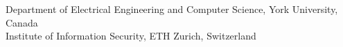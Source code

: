 {
  Department of Electrical Engineering and Computer Science, York University, Canada \\
  Institute of Information Security, ETH Zurich, Switzerland
}

\date[iFM 2013, 12/06/13]
{
  iFM 2013, Turku, Finland\\
  12th June 2013\\
}

\subject{Formal Methods}






\newcommand{\follows}{\Leftarrow}

\makeatletter
\newcommand*\dashV{\mathrel{\mathpalette\m@thr@fl@ct{\mathord\vDash}}}
\newcommand*\m@thr@fl@ct[2]{\reflectbox{$\m@th#1#2$}}
\makeatother
\newcommand{\abstracts}{\sqsubseteq}






\begin{frame}
  \titlepage
\end{frame}
\logo{}


